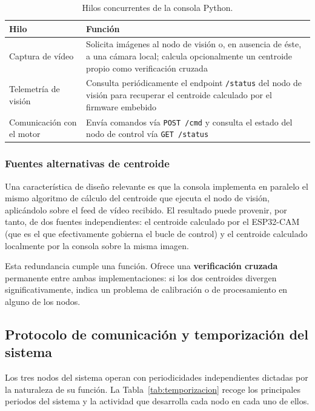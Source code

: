 \begin{table}[htbp]
    \centering
    \footnotesize
    \begin{tabular}{lp{8cm}}
        \toprule
        \textbf{Hilo} & \textbf{Función} \\
        \midrule
        Captura de vídeo & Solicita imágenes al nodo de visión o, en 
        ausencia de éste, a una cámara local; calcula opcionalmente 
        un centroide propio como verificación cruzada \\
        Telemetría de visión & Consulta periódicamente el endpoint 
        \texttt{/status} del nodo de visión para recuperar el 
        centroide calculado por el firmware embebido \\
        Comunicación con el motor & Envía comandos vía 
        \texttt{POST /cmd} y consulta el estado del nodo de control 
        vía \texttt{GET /status} \\
        \bottomrule
    \end{tabular}
    \caption{Hilos concurrentes de la consola Python.}
    \label{tab:hilos_consola}
\end{table}

\subsubsection{Fuentes alternativas de centroide}
Una característica de diseño relevante es que la consola implementa en paralelo el mismo algoritmo de cálculo del centroide que ejecuta el nodo de visión, aplicándolo sobre el feed de vídeo recibido. El resultado puede provenir, por tanto, de dos fuentes independientes: el centroide calculado por el ESP32-CAM (que es el que efectivamente gobierna el bucle de control) y el centroide calculado localmente por la consola sobre la misma imagen.

Esta redundancia cumple una función. Ofrece una \textbf{verificación cruzada} permanente entre ambas implementaciones: si los dos centroides divergen significativamente, indica un problema de calibración o de procesamiento en alguno de los nodos.

\subsection{Protocolo de comunicación y temporización del sistema}
\label{sec:protocolo_temporizacion}

Los tres nodos del sistema operan con periodicidades independientes dictadas por la naturaleza de su función. La Tabla~\ref{tab:temporizacion} recoge los principales periodos del sistema y la actividad que desarrolla cada nodo en cada uno de ellos.

